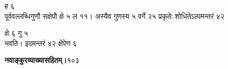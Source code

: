 \documentclass[11pt, openany]{book}
\begin{document}
\begin{sloppypar}
\hspace{4.4in}ह ६\\

\hangindent=0.2in पूर्ववल्लब्धिगुणौ सक्षेपौ क्षे ५ ल ११। अस्यैव गुणस्य ५ वर्गे २५ प्रकृतेः शोधितेऽल्पमन्तरं ४२ 

\hspace{1.45in}क्षे ६ गु ५\\

\hangindent=0.2in भवति। इदमन्तरं ४२ क्षेपेण ६
\end{sloppypar}
\thispagestyle{empty}
\newpage

\onehalfspacing
\hspace{2in}\textbf{नवाङ्कुरव्याख्यासहितम्।}\hspace{2in}१०३

\vspace{5mm}
\end{document}
